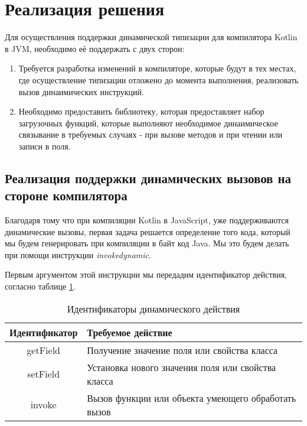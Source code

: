 \section{Реализация решения}

Для осуществления поддержки динамической типизации для компилятора Kotlin в JVM, необходимо её поддержать с двух сторон:

\begin{enumerate}
    \item Требуется разработка изменений в компиляторе, которые будут в тех местах, где осуществление типизации отложено до момента выполнения, реализовать вызов динаимических инструкций.
    \item Необходимо предоставить библиотеку, которая предоставляет набор загрузочных функций, которые выполняют необходимое динаимическое связывание в требуемых случаях - при вызове методов и при чтении или записи в поля.
\end{enumerate}

\subsection{Реализация поддержки динамических вызовов на стороне компилятора}
\label{sec:compileRealization}

Благодаря тому что при компиляции Kotlin в JavaScript, уже поддерживаются динамические вызовы, первая задача решается определение того кода, который мы будем генерировать при компиляции в байт код Java. Мы это будем делать при помощи инструкции \textit{invokedynamic}.


Первым аргументом этой инструкции мы передадим идентификатор действия, согласно таблице \ref{tab:DynamicCallType}. 

\begin{table}[h]
\caption{\label{tab:DynamicCallType}Идентификаторы динамического действия}
\begin{center}
\begin{tabular}{|c|l|}
\hline
Идентификатор	& Требуемое действие \\
\hline
getField & Получение значение поля или свойства класса  \\
setField & Установка нового значения поля или свойства класса	\\
invoke   & Вызов функции или объекта умеющего обработать вызов  \\
\hline
\end{tabular}
\end{center}
\end{table} 


